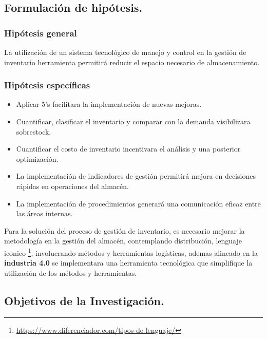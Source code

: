 \documentclass[
]{article}
\providecommand{\tightlist}{%
  \setlength{\itemsep}{0pt}\setlength{\parskip}{0pt}}
\begin{document}
\hypertarget{formulaciuxf3n-de-hipuxf3tesis.}{%
\subsection{Formulación de
hipótesis.}\label{formulaciuxf3n-de-hipuxf3tesis.}}

\hypertarget{hipuxf3tesis-general}{%
\subsubsection{Hipótesis general}\label{hipuxf3tesis-general}}

La utilización de un sistema tecnológico de manejo y control en la
gestión de inventario herramienta permitirá reducir el espacio necesario
de almacenamiento.

\hypertarget{hipuxf3tesis-especuxedficas}{%
\subsubsection{Hipótesis
específicas}\label{hipuxf3tesis-especuxedficas}}

\begin{itemize}
\tightlist
\item
  Aplicar 5's facilitara la implementación de nuevas mejoras.
\item
  Cuantificar, clasificar el inventario y comparar con la demanda
  visibilizara sobrestock.
\item
  Cuantificar el costo de inventario incentivara el análisis y una
  posterior optimización.
\item
  La implementación de indicadores de gestión permitirá mejora en
  decisiones rápidas en operaciones del almacén.
\item
  La implementación de procedimientos generará una comunicación eficaz
  entre las áreas internas.
\end{itemize}

Para la solución del proceso de gestión de inventario, es necesario
mejorar la metodología en la gestión del almacén, contemplando
distribución, lenguaje iconico \footnote{\url{https://www.diferenciador.com/tipos-de-lenguaje/}},
involucrando métodos y herramientas logísticas, ademas alineado en la
\textbf{industria 4.0} se implementara una herramienta tecnológica que
simplifique la utilización de los métodos y herramientas.

\hypertarget{objetivos-de-la-investigaciuxf3n.}{%
\subsection{Objetivos de la
Investigación.}\label{objetivos-de-la-investigaciuxf3n.}}
\end{document}
